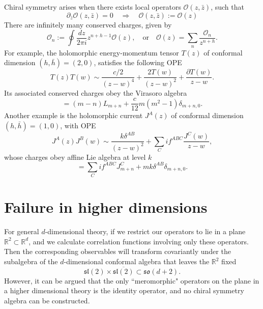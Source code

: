 \documentclass[a4paper,11pt]{article}
\begin{document}
Chiral symmetry arises when there exists local operators $\mathcal{O}(z, \bar{z})$, such that
\begin{equation}
    \partial_{\bar{z}} \mathcal{O}(z, \bar{z}) = 0 \quad\Rightarrow\quad \mathcal{O}(z, \bar{z}) := \mathcal{O}(z)
\end{equation}
There are infinitely many conserved charges, given by
\begin{equation}
    \mathcal{O}_n := \oint \frac{dz}{2\pi i} z^{n+h-1} \mathcal{O}(z), \quad \mathrm{or} \quad \mathcal{O}(z) = \sum_n \frac{\mathcal{O}_n}{z^{n+h}}.
\end{equation}
For example, the holomorphic energy-momentum tensor $T(z)$ of conformal dimension $(h, \bar{h}) = (2,0)$, satisfies the following OPE
\begin{equation}
    T(z) T(w) \sim \frac{c/2}{(z-w)^4} + \frac{2 T(w)}{(z-w)^2} + \frac{\partial T(w)}{z-w}.
\end{equation}
Its associated conserved charges obey the Virasoro algebra
\begin{equation}
    [L_m, L_n] = (m-n) L_{m+n} + \frac{c}{12} m (m^2-1) \delta_{m+n,0}.
\end{equation}
Another example is the holomorphic current $J^A(z)$ of conformal dimension $(h, \bar{h}) = (1, 0)$, with OPE
\begin{equation}
    J^A(z) J^B(w) \sim \frac{k \delta^{AB}}{(z-w)^2} + \sum_C i f^{ABC} \frac{J^C(w)}{z-w},
\end{equation}
whose charges obey affine Lie algebra at level $k$
\begin{equation}
    [J^A_m, J^B_n] = \sum_C i f^{ABC} J^C_{m+n} + m k \delta^{AB} \delta_{m+n, 0}.
\end{equation}

\section{Failure in higher dimensions}
For general $d$-dimensional theory, if we restrict our operators to lie in a plane $\mathbb{R}^2 \subset \mathbb{R}^d$, and we calculate correlation functions involving only these operators. Then the corresponding observables will transform covariantly under the subalgebra of the $d$-dimensional conformal algebra that leaves the $\mathbb{R}^2$ fixed
\begin{equation}
    \mathfrak{sl}(2) \times \overline{\mathfrak{sl}(2)} \subset \mathfrak{so}(d+2).
\end{equation}
However, it can be argued that the only ``meromorphic" operators on the plane in a higher dimensional theory is the identity operator, and no chiral symmetry algebra can be constructed.
\end{document}
